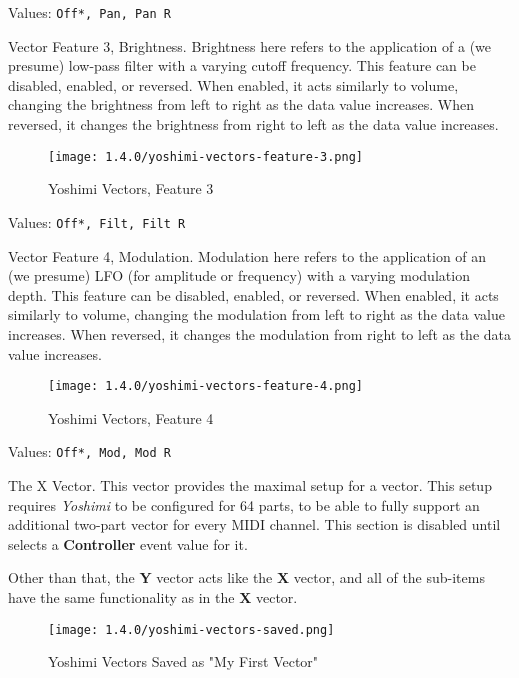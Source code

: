    Values: \texttt{Off*, Pan, Pan R}

   Vector Feature 3, Brightness.
   Brightness here refers to the application of a (we presume) low-pass filter
   with a varying cutoff frequency.
   This feature can be disabled, enabled, or reversed.
   When enabled, it acts similarly to volume, changing the brightness
   from left to right as the data value increases.
   When reversed, it changes the brightness from right to left as the data
   value increases.

\begin{figure}[H]
   \centering 
   \texttt{[image: 1.4.0/yoshimi-vectors-feature-3.png]}
   \caption{Yoshimi Vectors, Feature 3}
   \label{fig:yoshimi_vectors_feature_3}
\end{figure}

   Values: \texttt{Off*, Filt, Filt R}

   Vector Feature 4, Modulation.
   Modulation here refers to the application of an (we presume) LFO
   (for amplitude or frequency) with a varying modulation depth.
   This feature can be disabled, enabled, or reversed.
   When enabled, it acts similarly to volume, changing the modulation
   from left to right as the data value increases.
   When reversed, it changes the modulation from right to left as the data
   value increases.

\begin{figure}[H]
   \centering 
   \texttt{[image: 1.4.0/yoshimi-vectors-feature-4.png]}
   \caption{Yoshimi Vectors, Feature 4}
   \label{fig:yoshimi_vectors_feature_4}
\end{figure}

   Values: \texttt{Off*, Mod, Mod R}

   The X Vector.
   This vector provides the maximal setup for a vector.  This setup requires
   \textsl{Yoshimi} to be configured for 64 parts, to be able to fully support
   an additional two-part vector for every MIDI channel.  This section is
   disabled until selects a \textbf{Controller} event value for it.

   Other than that, the \textbf{Y} vector acts like the \textbf{X} vector, and
   all of the sub-items have the same functionality as in the
   \textbf{X} vector.

\begin{figure}[H]
   \centering 
   \texttt{[image: 1.4.0/yoshimi-vectors-saved.png]}
   \caption{Yoshimi Vectors Saved as "My First Vector"}
   \label{fig:yoshimi_vectors_saved}
\end{figure}

